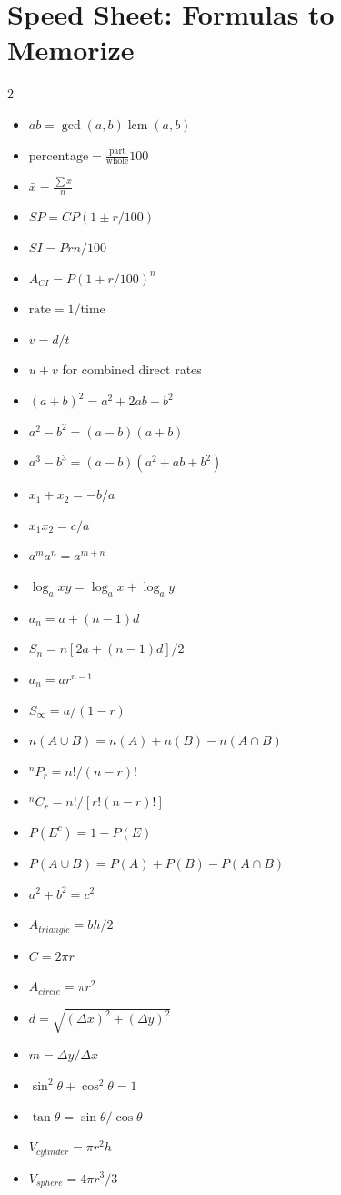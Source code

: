 \documentclass[12pt,a4paper,oneside]{book}
\begin{document}
\chapter[Formula Speed Sheet]{Speed Sheet: Formulas to Memorize}
\begin{multicols}{2}
\small
\begin{itemize}[leftmargin=*]
\item \(ab=\gcd(a,b)\operatorname{lcm}(a,b)\)
\item \(\text{percentage}=\frac{\text{part}}{\text{whole}}100\)
\item \(\bar x=\frac{\sum x}{n}\)
\item \(SP=CP(1\pm r/100)\)
\item \(SI=Prn/100\)
\item \(A_{CI}=P(1+r/100)^n\)
\item \(\text{rate}=1/\text{time}\)
\item \(v=d/t\)
\item \(u+v\) for combined direct rates
\item \((a+b)^2=a^2+2ab+b^2\)
\item \(a^2-b^2=(a-b)(a+b)\)
\item \(a^3-b^3=(a-b)(a^2+ab+b^2)\)
\item \(x_1+x_2=-b/a\)
\item \(x_1x_2=c/a\)
\item \(a^m a^n=a^{m+n}\)
\item \(\log_a xy=\log_a x+\log_a y\)
\item \(a_n=a+(n-1)d\)
\item \(S_n=n[2a+(n-1)d]/2\)
\item \(a_n=ar^{n-1}\)
\item \(S_\infty=a/(1-r)\)
\item \(n(A\cup B)=n(A)+n(B)-n(A\cap B)\)
\item \({}^nP_r=n!/(n-r)!\)
\item \({}^nC_r=n!/[r!(n-r)!]\)
\item \(P(E^c)=1-P(E)\)
\item \(P(A\cup B)=P(A)+P(B)-P(A\cap B)\)
\item \(a^2+b^2=c^2\)
\item \(A_{triangle}=bh/2\)
\item \(C=2\pi r\)
\item \(A_{circle}=\pi r^2\)
\item \(d=\sqrt{(\Delta x)^2+(\Delta y)^2}\)
\item \(m=\Delta y/\Delta x\)
\item \(\sin^2\theta+\cos^2\theta=1\)
\item \(\tan\theta=\sin\theta/\cos\theta\)
\item \(V_{cylinder}=\pi r^2h\)
\item \(V_{sphere}=4\pi r^3/3\)
\end{itemize}
\end{multicols}
\end{document}
